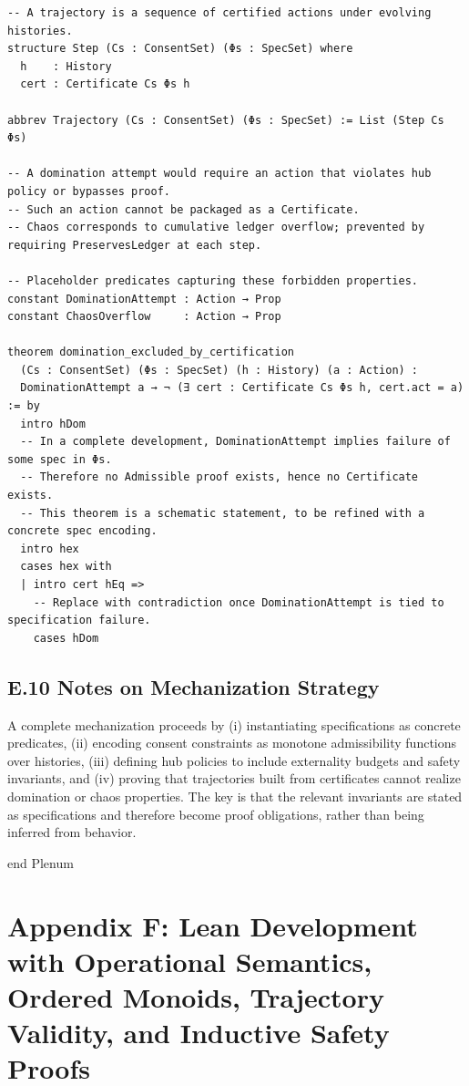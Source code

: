 \documentclass[11pt,oneside]{article}
\begin{document}
\begin{verbatim}
-- A trajectory is a sequence of certified actions under evolving histories.
structure Step (Cs : ConsentSet) (Φs : SpecSet) where
  h    : History
  cert : Certificate Cs Φs h

abbrev Trajectory (Cs : ConsentSet) (Φs : SpecSet) := List (Step Cs Φs)

-- A domination attempt would require an action that violates hub policy or bypasses proof.
-- Such an action cannot be packaged as a Certificate.
-- Chaos corresponds to cumulative ledger overflow; prevented by requiring PreservesLedger at each step.

-- Placeholder predicates capturing these forbidden properties.
constant DominationAttempt : Action → Prop
constant ChaosOverflow     : Action → Prop

theorem domination_excluded_by_certification
  (Cs : ConsentSet) (Φs : SpecSet) (h : History) (a : Action) :
  DominationAttempt a → ¬ (∃ cert : Certificate Cs Φs h, cert.act = a) := by
  intro hDom
  -- In a complete development, DominationAttempt implies failure of some spec in Φs.
  -- Therefore no Admissible proof exists, hence no Certificate exists.
  -- This theorem is a schematic statement, to be refined with a concrete spec encoding.
  intro hex
  cases hex with
  | intro cert hEq =>
    -- Replace with contradiction once DominationAttempt is tied to specification failure.
    cases hDom

\end{verbatim}

\subsection{E.10 Notes on Mechanization Strategy}

A complete mechanization proceeds by (i) instantiating specifications as concrete predicates, (ii) encoding consent constraints as monotone admissibility functions over histories, (iii) defining hub policies to include externality budgets and safety invariants, and (iv) proving that trajectories built from certificates cannot realize domination or chaos properties. The key is that the relevant invariants are stated as specifications and therefore become proof obligations, rather than being inferred from behavior.

end Plenum

\section{Appendix F: Lean Development with Operational Semantics, Ordered Monoids, Trajectory Validity, and Inductive Safety Proofs}
\end{document}
